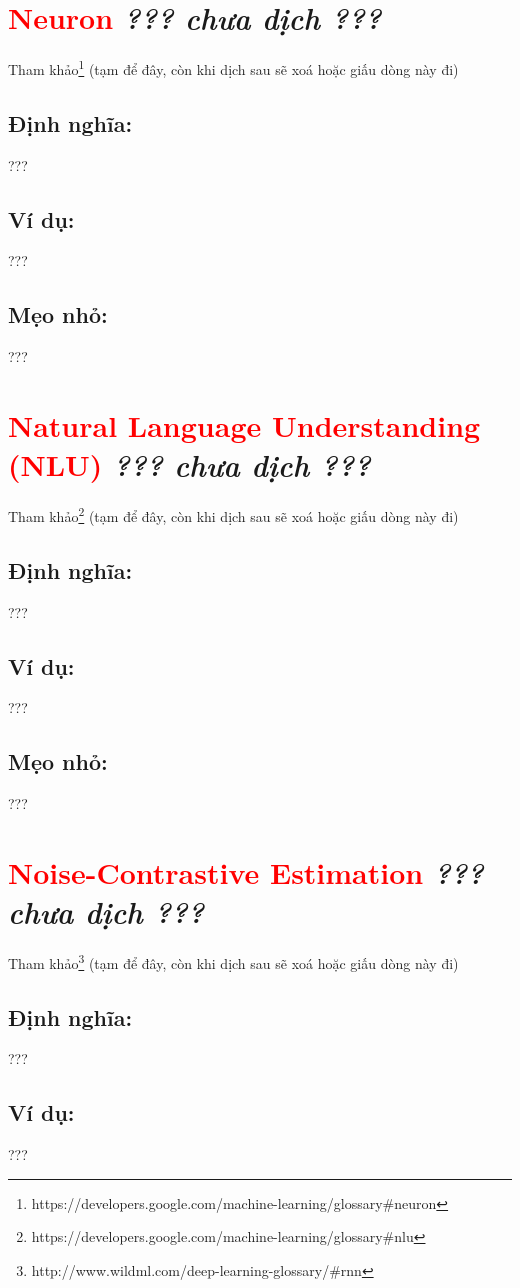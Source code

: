 \section*{\huge \textcolor{Red}{Neuron}  \small \textit{??? chưa dịch ???} }
Tham khảo\footnote{https://developers.google.com/machine-learning/glossary\#neuron} (tạm để đây, còn khi dịch sau sẽ xoá hoặc giấu dòng này đi)
\subsection*{Định nghĩa:}
???
\subsection*{Ví dụ:}
???
\subsection*{Mẹo nhỏ:}
???
\section*{\huge \textcolor{Red}{Natural Language Understanding (NLU)}  \small \textit{??? chưa dịch ???} }
Tham khảo\footnote{https://developers.google.com/machine-learning/glossary\#nlu} (tạm để đây, còn khi dịch sau sẽ xoá hoặc giấu dòng này đi)
\subsection*{Định nghĩa:}
???
\subsection*{Ví dụ:}
???
\subsection*{Mẹo nhỏ:}
???
\section*{\huge \textcolor{Red}{Noise-Contrastive Estimation}  \small \textit{??? chưa dịch ???} }
Tham khảo\footnote{http://www.wildml.com/deep-learning-glossary/\#rnn} (tạm để đây, còn khi dịch sau sẽ xoá hoặc giấu dòng này đi)
\subsection*{Định nghĩa:}
???
\subsection*{Ví dụ:}
???
